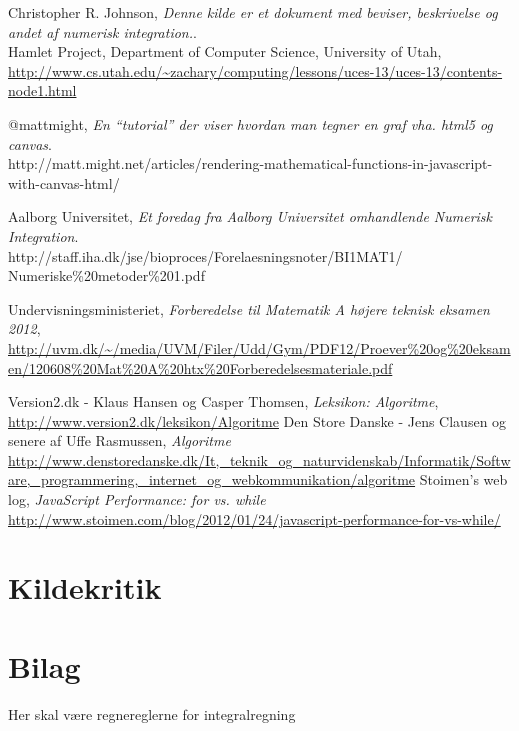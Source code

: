 \documentclass[12pt]{article}
\numberwithin{equation}{section}
\begin{document}
\clearpage
{}
\begin{thebibliography}{9}

  	Christopher R. Johnson,
  	\emph{Denne kilde er et dokument med beviser, beskrivelse og andet af numerisk integration.}.\\
  	Hamlet Project, 
  	Department of Computer Science,
	University of Utah,
	\url{http://www.cs.utah.edu/~zachary/computing/lessons/uces-13/uces-13/contents-node1.html}
	
	@mattmight,
	\emph{En ``tutorial'' der viser hvordan man tegner en graf vha. html5 og canvas}.\\
	http://matt.might.net/articles/rendering-mathematical-functions-in-javascript-with-canvas-html/

	Aalborg Universitet,
	\emph{Et foredag fra Aalborg Universitet omhandlende Numerisk Integration}.\\
	http://staff.iha.dk/jse/bioproces/Forelaesningsnoter/BI1MAT1/\\Numeriske\%20metoder\%201.pdf
	
	Undervisningsministeriet,
	\emph{Forberedelse til Matematik A højere teknisk eksamen 2012},
	\url{http://uvm.dk/~/media/UVM/Filer/Udd/Gym/PDF12/Proever\%20og\%20eksamen/120608\%20Mat\%20A\%20htx\%20Forberedelsesmateriale.pdf}
	
	Version2.dk - Klaus Hansen og Casper Thomsen,
	\emph{Leksikon: Algoritme},
	\url{http://www.version2.dk/leksikon/Algoritme}
	Den Store Danske - Jens Clausen og senere af Uffe Rasmussen,
	\emph{Algoritme}
	\url{http://www.denstoredanske.dk/It,_teknik_og_naturvidenskab/Informatik/Software,_programmering,_internet_og_webkommunikation/algoritme}
	Stoimen's web log,
	\emph{JavaScript Performance: for vs. while}
	\url{http://www.stoimen.com/blog/2012/01/24/javascript-performance-for-vs-while/}
\end{thebibliography}

\section{Kildekritik}
\section{Bilag}
Her skal være regnereglerne for integralregning
\end{document}
